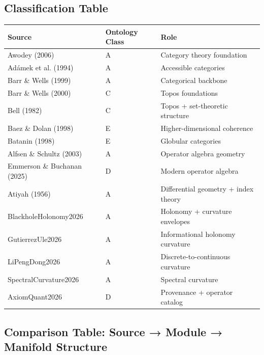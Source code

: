 \newcommand{\citeClassA}[1]{\textsuperscript{A}\cite{#1}}
\newcommand{\citeClassB}[1]{\textsuperscript{B}\cite{#1}}
\newcommand{\citeClassC}[1]{\textsuperscript{C}\cite{#1}}
\newcommand{\citeClassD}[1]{\textsuperscript{D}\cite{#1}}
\newcommand{\citeClassE}[1]{\textsuperscript{E}\cite{#1}}

\subsection{Classification Table}

\begin{center}
\begin{tabular}{lll}
\textbf{Source} & \textbf{Ontology Class} & \textbf{Role} \\
\hline
Awodey (2006) & A & Category theory foundation \\
Adámek et al. (1994) & A & Accessible categories \\
Barr \& Wells (1999) & A & Categorical backbone \\
Barr \& Wells (2000) & C & Topos foundations \\
Bell (1982) & C & Topos + set-theoretic structure \\
Baez \& Dolan (1998) & E & Higher-dimensional coherence \\
Batanin (1998) & E & Globular categories \\
Alfsen \& Schultz (2003) & A & Operator algebra geometry \\
Emmerson \& Buchanan (2025) & D & Modern operator algebra \\
Atiyah (1956) & A & Differential geometry + index theory \\
BlackholeHolonomy2026 & A & Holonomy + curvature envelopes \\
GutierrezUle2026 & A & Informational holonomy curvature \\
LiPengDong2026 & A & Discrete-to-continuous curvature \\
SpectralCurvature2026 & A & Spectral curvature \\
AxiomQuant2026 & D & Provenance + operator catalog \\
\end{tabular}
\end{center}

\subsection{Comparison Table: Source → Module → Manifold Structure}

